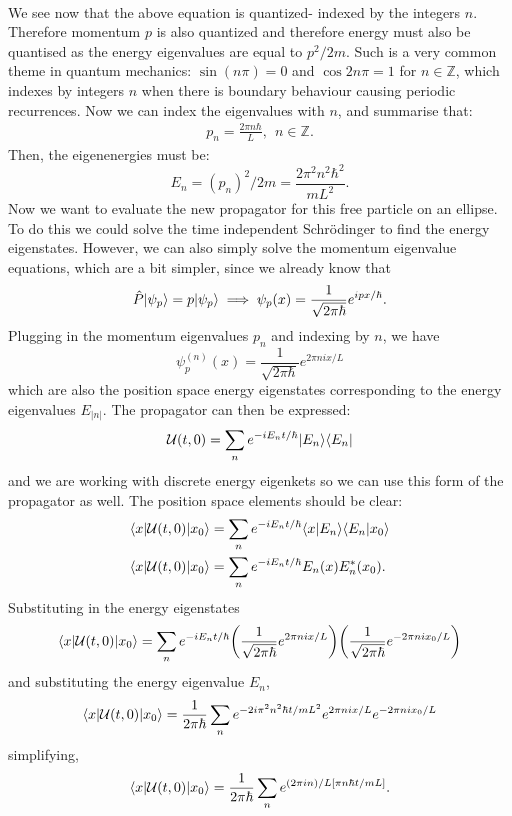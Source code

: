 \\
We see now that the above equation is quantized- indexed by the integers $n$. Therefore momentum $p$ is also quantized and therefore energy must also be quantised as the energy eigenvalues are equal to $p^2/2m$. Such is a very common theme in quantum mechanics: $\sin(n\pi) = 0$ and $\cos{2n\pi}=1$ for $n\in\mathbb{Z}$, which indexes by integers $n$ when there is boundary behaviour causing periodic recurrences. Now we can index the eigenvalues with $n$, and summarise that:
$$
\begin{aligned}
p_n= \frac{2\pi n\hbar}{L}, \:\: n\in\mathbb{Z}.
\end{aligned}
$$
Then, the eigenenergies must be:
$$
E_{n}=(p_n)^2/2m=\frac{2\pi^2n^2\hbar^2}{mL^2}.
$$
Now we want to evaluate the new propagator for this free particle on an ellipse. To do this we could solve the time independent Schr\"{o}dinger to find the energy eigenstates. However, we can also simply solve the momentum eigenvalue equations, which are a bit simpler, since we already know that 
$$
\hat{P}|\psi_{p}\rangle=p|\psi_{p}\rangle\implies \psi_{p}(x)=\frac{1}{\sqrt{2\pi\hbar}}e^{ipx/\hbar}.
$$
Plugging in the momentum eigenvalues $p_{n}$ and indexing by $n$, we have
$$
\psi_{p}^{(n)}(x)=\frac{1}{\sqrt{2\pi\hbar}}e^{2\pi nix/L}
$$
which are also the position space energy eigenstates corresponding to the energy eigenvalues $E_{|n|}$. The propagator can then be expressed:
$$
\mathcal{U}(t,0)=\sum_{n}e^{-iE_{n}t/\hbar}|E_{n}\rangle\langle E_{n}|
$$
and we are working with discrete energy eigenkets so we can use this form of the propagator as well. The position space elements should be clear:
$$
\begin{aligned}
\langle x|{\mathcal{U}(t,0)}|x_{0}\rangle&=\sum_{n}e^{-iE_{n}t/\hbar}\langle x|E_{n}\rangle\langle E_{n}|x_{0}\rangle\\
\langle x|{\mathcal{U}(t,0)}|x_{0}\rangle&=\sum_{n}e^{-iE_{n}t/\hbar}E_{n}(x)E_{n}^{\ast}(x_{0}).
\end{aligned}
$$
Substituting in the energy eigenstates 
$$
\langle x|{\mathcal{U}(t,0)}|x_{0}\rangle=\sum_{n}e^{-iE_{n}t/\hbar}\biggl(\frac{1}{\sqrt{2\pi\hbar}}e^{2\pi nix/L}\biggr)\biggl(\frac{1}{\sqrt{2\pi\hbar}}e^{-2\pi nix_{0}/L}\biggr)
$$
and substituting the energy eigenvalue $E_{n}$,
$$
\langle x|{\mathcal{U}(t,0)}|x_{0}\rangle=\frac{1}{2\pi \hbar}\sum_{n}e^{-2i\pi^{2}n^{2}\hbar t/mL^{2}}e^{2\pi nix/L}e^{-2\pi nix_{0}/L}
$$
simplifying,
$$
\langle x|{\mathcal{U}(t,0)}|x_{0}\rangle=\frac{1}{2\pi \hbar}\sum_{n}e^{(2\pi i n)/L[\pi n\hbar t/mL ]}.
$$
\\\\

